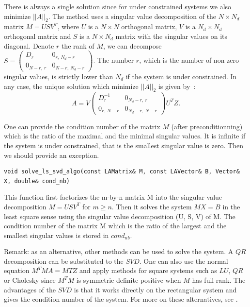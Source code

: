 There is always a single solution since for under constrained systems
we also minimize $||A||_2$.  The method uses a singular value
decomposition of the $N\times N_d$ matrix $M= U S V^T$, where $U$ is a
$N \times N$ orthogonal matrix, $V$ is a $N_d \times N_d$ orthogonal
matrix and $S$ is a $N\times N_d$ matrix with the singular values on
its diagonal. Denote $r$ the rank of $M$, we can decompose 
%
$S= \begin{pmatrix}
D_r & 0_{r,\ N_d-r}\\
0_{N-r,\ r} & 0_{N-r,\ N_d-r}
\end{pmatrix}.
$
%
The number $r$, which is the number of non zero singular values, is
strictly lower than $N_d$ if the system is under constrained. In any
case, the unique solution which minimize $||A||_2$ is given by~:
\begin{equation}
A= V\begin{pmatrix}
D_r^{-1} & 0_{N_d-r,\ r}\\
0_{r,\ N-r} & 0_{N_d-r,\ N-r}
\end{pmatrix} U^TZ.
\end{equation}

One can provide the condition number
of the matrix $M$ (after preconditionning) which is the ratio of the
maximal and the minimal singular values. It is infinite if the system
is under constrained, that is the smallest singular value is
zero. Then we should provide an exception.

\begin{verbatim}
void solve_ls_svd_algo(const LAMatrix& M, const LAVector& B, Vector& X, double& cond_nb)
\end{verbatim} 
 
This function first factorizes the m-by-n matrix M into the singular
value decomposition $M = U S V^T$ for $m \geq n$.  Then it solves the
system $MX = B$ in the least square sense using the singular value
decomposition (U, S, V) of M. The condition number of the matrix M
which is the ratio of the largest and the smallest singular values is
stored in $cond_{nb}$.

\medskip
Remark: as an alternative, other methods can be used to solve the
system. A $QR$ decomposition can be substituted to the $SVD$. One can
also use the normal equation $M^TMA=MTZ$ and apply methods for square
systems such as $LU$, $QR$ or Cholesky since $M^TM$ is symmetric
definite positive when $M$ has full rank. 
The advantages of the $SVD$
is that it works directly on the rectangular system and gives the
condition number of the system. For more on these alternatives, see
\cite{gl-mc-83}.

